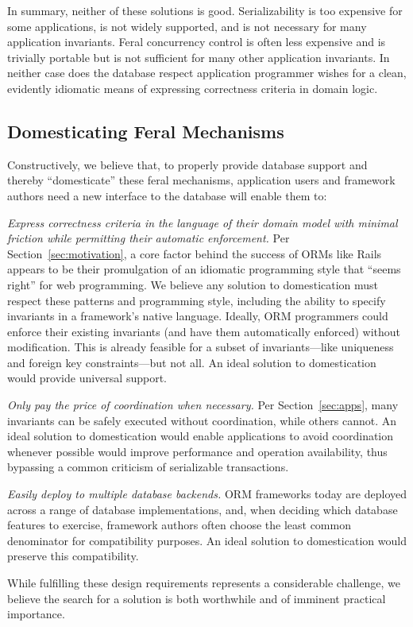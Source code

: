 In summary, neither of these solutions is good. Serializability is too
expensive for some applications, is not widely supported, and is not
necessary for many application invariants. Feral concurrency control
is often less expensive and is trivially portable but is not
sufficient for many other application invariants. In neither case does
the database respect application programmer wishes for a clean,
evidently idiomatic means of expressing correctness criteria in domain
logic.

\subsection{Domesticating Feral Mechanisms}

Constructively, we believe that, to properly provide database support
and thereby ``domesticate'' these feral mechanisms, application users
and framework authors need a new interface to the database will enable
them to:
\begin{interfaceenumerate} 
\item \textit{Express correctness criteria in the language of their
    domain model with minimal friction while permitting their
    automatic enforcement.} Per Section~\ref{sec:motivation}, a core
  factor behind the success of ORMs like Rails appears to be their
  promulgation of an idiomatic programming style that ``seems right''
  for web programming. We believe any solution to domestication must
  respect these patterns and programming style, including the ability
  to specify invariants in a framework's native language. Ideally, ORM
  programmers could enforce their existing invariants (and have them
  automatically enforced) without modification. This is already
  feasible for a subset of invariants---like uniqueness and foreign
  key constraints---but not all. An ideal solution to domestication
  would provide universal support.

\item \textit{Only pay the price of coordination when necessary.} Per
  Section~\ref{sec:apps}, many invariants can be safely executed
  without coordination, while others cannot. An ideal solution to
  domestication would enable applications to avoid coordination
  whenever possible would improve performance and operation
  availability, thus bypassing a common criticism of serializable
  transactions.

\item \textit{Easily deploy to multiple database backends.}  ORM
  frameworks today are deployed across a range of database
  implementations, and, when deciding which database features to
  exercise, framework authors often choose the least common
  denominator for compatibility purposes. An ideal solution to
  domestication would preserve this compatibility.

\end{interfaceenumerate}
While fulfilling these design requirements represents a considerable
challenge, we believe the search for a solution is both worthwhile and
of imminent practical importance.

